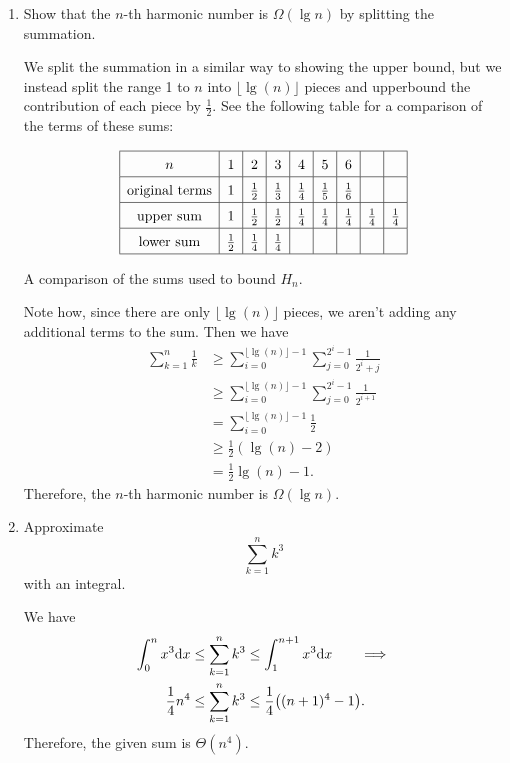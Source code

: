 \documentclass[AppendixA]{subfiles}
\begin{document}
\begin{enumerate}
		\item Show that the $n$-th harmonic number is $\Omega(\lg n)$ by splitting the summation.
		\begin{answer}
			We split the summation in a similar way to showing the upper bound, but we instead split the range 1 to $n$ into $\lfloor \lg(n) \rfloor$ pieces and upperbound the contribution of each piece by $\frac{1}{2}$. See the following table for a comparison of the terms of these sums:
			\begin{table}[H]
				\[
					\renewcommand{\arraystretch}{1.5}
					\begin{array}{|c|c|c|c|c|c|c|c|c|}
						\hline
						n & 1 & 2 & 3 & 4 & 5 & 6 & & \\\hline
						\text{original terms} & 1 & \frac{1}{2} & \frac{1}{3} & \frac{1}{4} & \frac{1}{5} & \frac{1}{6} & & \\\hline
						\text{upper sum} & 1 & \frac{1}{2} & \frac{1}{2} & \frac{1}{4} & \frac{1}{4} & \frac{1}{4} & \frac{1}{4} & \frac{1}{4} \\\hline
						\text{lower sum} & \frac{1}{2} & \frac{1}{4} & \frac{1}{4} & & & & &\\\hline
					\end{array}
				\]
				\caption{A comparison of the sums used to bound $H_n$.}
			\end{table}

			Note how, since there are only $\lfloor \lg(n) \rfloor$ pieces, we aren't adding any additional terms to the sum. Then we have
			\begin{align*}
				\sum_{k = 1}^n \frac{1}{k} &\geq \sum_{i = 0}^{\lfloor \lg(n) \rfloor - 1} \sum_{j = 0}^{2^i - 1} \frac{1}{2^i + j}\\
					&\geq \sum_{i = 0}^{\lfloor \lg(n) \rfloor - 1} \sum_{j = 0}^{2^i - 1} \frac{1}{2^{i + 1}}\\
					&= \sum_{i = 0}^{\lfloor \lg(n) \rfloor - 1} \frac{1}{2}\\
					&\geq \frac{1}{2}(\lg(n) - 2)\\
					&= \frac{1}{2} \lg(n) - 1.
			\end{align*}
			Therefore, the $n$-th harmonic number is $\Omega(\lg n)$.
		\end{answer}
		
		\item Approximate
		\[
			\sum_{k = 1}^n k^3
		\]
		with an integral.
		\begin{answer}
			We have
			\begin{align*}
				\int_0^n x^3 \dd x &\leq \sum_{k = 1}^n k^3 \leq \int_1^{n+1} x^3 \dd x \tag*{$\implies$}\\
				\frac{1}{4}n^4     &\leq \sum_{k = 1}^n k^3 \leq \frac{1}{4}\qty((n+1)^4 - 1).
			\end{align*}
			Therefore, the given sum is $\Theta(n^4)$.
		\end{answer}
		

\end{enumerate}
\end{document}
